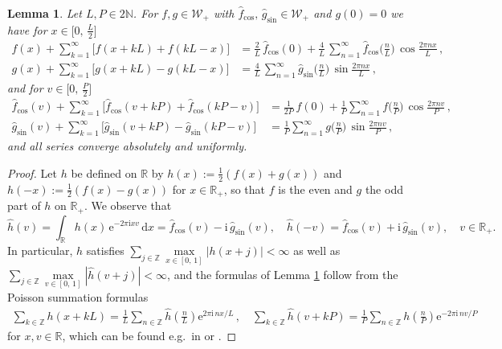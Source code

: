 \documentclass[11pt,a4paper]{scrartcl}
\renewcommand{\d}{\,\mathrm{d}}
\newtheorem{lemma}[theorem]{Lemma}
\numberwithin{equation}{section}
\numberwithin{table}{section}
\numberwithin{figure}{section}
\newcommand{\e}{\mathrm e}
\renewcommand{\i}{\mathrm i}
\newcommand{\R}{\mathbb R}
\newcommand{\Z}{\mathbb Z}
\newcommand{\N}{\mathbb N}
\newcommand{\Rp}{{\mathbb R}_{+}}
\newcommand{\W}{{\mathcal W}}
\newcommand{\fcos}{{\hat f}_{\cos}}
\begin{document}
\begin{lemma}
	\label{Lemma:FTPoissonsum}
	Let $L, P \in 2\N$. For $f, g \in \W_+$ with $\hat{f}_{\cos}, \, \hat{g}_{\sin} \in \W_+$ and $g(0)=0$ we have for $x \in \big[0,\,\tfrac{L}{2}\big]$
	\begin{align} \label{eq:Poisson1}
		 \textstyle f(x) + \sum\limits_{k = 1}^{\infty}\big[ f(x + kL) + f(kL-x)\big]
             &=  \textstyle \frac{2}{L}\,\fcos(0) + \frac{4}{L}\,\sum\limits_{n = 1}^{\infty}\fcos\big(\tfrac{n}{L
          }\big)\, \cos\frac{2\pi nx}{L}\, ,
		\\
		\label{eq:Poisson3}
		 \textstyle g(x) + \sum\limits_{k = 1}^{\infty}\big[ g(x + kL) - g(kL-x)\big]
             &=  \textstyle  \frac{4}{L}\,\sum\limits_{n = 1}^{\infty} \hat{g}_{\sin}\big(\tfrac{n}{L}\big)\, \sin\frac{2\pi nx}{L}\,,
             \end{align}
             and for $v \in \big[0,\,\tfrac{P}{2}\big]$
\begin{align}
		\label{eq:Poisson2}
		 \textstyle  \fcos(v) + \sum\limits_{k = 1}^{\infty} \big[\fcos(v + kP)+ \fcos(kP-v)\big]
                         &=  \textstyle  \frac{1}{2P}\,f(0) + \frac{1}{P}\sum\limits_{n = 1}^{\infty}f\big(\tfrac{n}{P}\big)\, \cos \frac{2\pi nv}{P}\,,\\
                         \label{eq:Poisson4}
                 \textstyle   \hat{g}_{\sin}(v) + \sum\limits_{k = 1}^{\infty} \big[ \hat{g}_{\sin}(v + kP)-  \hat{g}_{\sin}(kP-v)\big]
                         &=  \textstyle  \frac{1}{P}\sum\limits_{n = 1}^{\infty}g\big(\tfrac{n}{P}\big)\, \sin \frac{2\pi nv}{P}\,,
	\end{align}	
		and all series converge absolutely and uniformly.
\end{lemma}

\begin{proof}
Let $h$ be defined on $\R$ by $h(x) := \frac12 (f(x)+g(x))$ and $h(-x) := \frac12 (f(x)-g(x))$
for $x \in \mathbb R_{+}$, so that $f$ is the even and $g$ the odd part of $h$ on ${\mathbb R}_+$. We observe that
$$
\textstyle  \hat{h}(v) = \int_{\mathbb R} h(x) \, \e^{-2\pi \i xv} \d x = \fcos(v) - \i\, \hat{g}_{\sin}(v), \quad
\hat{h}(-v) =  \fcos(v) + \i\, \hat{g}_{\sin}(v), \quad v \in \Rp.
$$
 In particular, $h$ satisfies $ \sum\limits_{j \in \mathbb Z} \max\limits_{x \in [0,\,1]} |h(x + j)| < \infty$
as well as $ \sum\limits_{j \in \mathbb Z} \max\limits_{v \in [0,\,1]} |\hat{h}(v + j)| < \infty$,
and the formulas of
Lemma \ref{Lemma:FTPoissonsum} follow from the Poisson summation formulas
\begin{align*}
\textstyle \sum\limits_{k\in\Z} h(x+kL) = \frac{1}{L}\sum\limits_{n\in\Z}
		\hat{h}\!\left(\frac{n}{L}\right)\e^{2\pi\i\,nx/L}\,,
		\quad
		\sum\limits_{k\in\Z} \hat{h}(v+kP) = \frac{1}{P}\sum\limits_{n\in\Z}
		h\!\left(\frac{n}{P}\right)\e^{-2\pi\i\,nv/P}
	\end{align*}
for $x, v \in {\mathbb R}$, which can be found e.g.\ in \cite[pp.~15--16]{G96}  or \cite[Theorem~2.28]{PlPoStTa23}.
	\end{proof}
\end{document}
